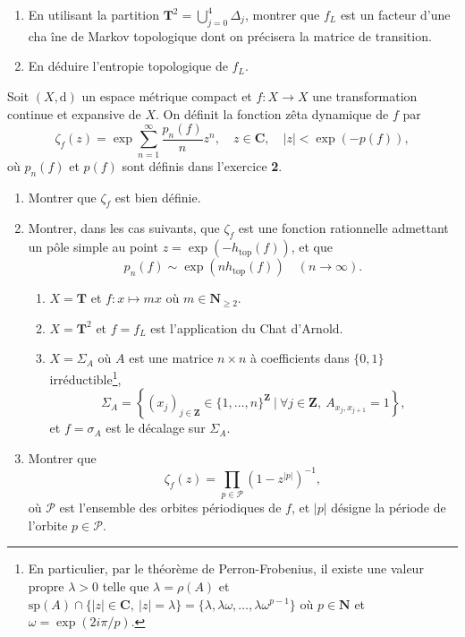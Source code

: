 \documentclass[a4paper,10pt,openany]{article}
\theoremstyle{plain}
\theoremstyle{definition}
\newcommand{\dd}{\mathrm{d}}
\newcommand{\T}{\mathbf{T}}
\newcommand{\Z}{\mathbf{Z}}
\newcommand{\N}{\mathbf{N}}
\newcommand{\C}{\mathbf{C}}
\newcommand{\htop}{h_\mathrm{top}}
\begin{document}
\begin{enumerate}
\item En utilisant la partition $\T^2 = \bigcup_{j=0}^4 \Delta_j$, montrer que $f_L$ est un facteur d'une cha \^ine de Markov topologique dont on pr\'ecisera la matrice de transition.
\item En d\'eduire l'entropie topologique de $f_L$.
\end{enumerate}


\vspace{0.6cm}

 \vspace{1.5mm} 

\noindent Soit $(X, \dd)$ un espace m\'etrique compact et $f : X \to X$ une transformation continue et expansive de $X$. On d\'efinit la fonction z\^eta dynamique de $f$ par
$$
\zeta_f(z) = \exp \sum_{n=1}^\infty \frac{p_n(f)}{n} z^n, \quad z \in \C, \quad |z| < \exp (- p(f)),
$$
o\`u $p_n(f)$ et $p(f)$ sont d\'efinis dans l'exercice \textbf{2}.
\begin{enumerate}
\item Montrer que $\zeta_f$ est bien d\'efinie.
\item Montrer, dans les cas suivants, que $\zeta_f$ est une fonction rationnelle admettant un p\^ole simple au point $z = \exp \left(-h_\mathrm{top}(f)\right)$, et que
$$
p_n(f) \sim \exp\left(n\htop(f)\right) \quad (n \to \infty).
$$
\begin{enumerate}
\item $X = \T$ et $f : x  \mapsto mx $ o\`u $m \in \N_{\geq 2}$.
\item $X = \T^2$ et $f = f_L$ est l'application du Chat d'Arnold.
\item $X = \Sigma_A$ o\`u $A$ est une matrice $n \times n$ \`a coefficients dans $\{0,1\}$ irr\'eductible\footnote{En particulier, par le th\'eor\`eme de Perron-Frobenius, il existe une valeur propre $\lambda > 0$ telle que $\lambda = \rho(A)$ et $\mathrm{sp}(A) \cap \{|z| \in \C,~ |z| = \lambda\} = \{\lambda, \lambda \omega, \dots, \lambda \omega^{p-1}\}$ o\`u $p \in \N$ et $\omega = \exp(2 i \pi / p)$.}, 
$$\Sigma_A = \left\{(x_j)_{j \in \Z} \in \{1, \dots, n\}^\Z ~|~ \forall j \in \Z, ~A_{x_j, x_{j+1}} = 1\right\}, $$
et $f = \sigma_A$ est le d\'ecalage sur $\Sigma_A$.
\end{enumerate}

\item Montrer que 
$$
\zeta_f(z) = \prod_{p \in \mathcal{P}} \left(1 - z^{|p|}\right)^{-1},
$$
o\`u $\mathcal{P}$ est l'ensemble des orbites p\'eriodiques de $f$, et $|p|$ d\'esigne la p\'eriode de l'orbite $p \in \mathcal{P}$.

\end{enumerate}
\end{document}
